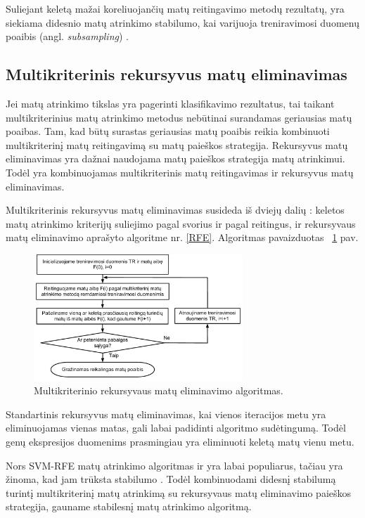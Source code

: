Suliejant keletą mažai koreliuojančių matų reitingavimo metodų rezultatų, yra siekiama didesnio matų atrinkimo stabilumo, kai varijuoja treniravimosi duomenų poaibis (angl. \textit{subsampling}) \cite{yang2011robust}.

\subsection{Multikriterinis rekursyvus matų eliminavimas}

Jei matų atrinkimo tikslas yra pagerinti klasifikavimo rezultatus, tai taikant multikriterinius matų atrinkimo metodus nebūtinai surandamas geriausias matų poaibas. Tam, kad būtų surastas geriausias matų poaibis reikia kombinuoti multikriterinį matų reitingavimą su matų paieškos strategija. Rekursyvus matų eliminavimas yra dažnai naudojama matų paieškos strategija matų atrinkimui. Todėl yra kombinuojamas multikriterinis matų reitingavimas ir rekursyvus matų eliminavimas.

Multikriterinis rekursyvus matų eliminavimas susideda iš dviejų dalių \cite{yang2011robust}: keletos matų atrinkimo kriterijų suliejimo pagal svorius ir pagal reitingus, ir rekursyvaus matų eliminavimo aprašyto algoritme nr. \ref{RFE}. Algoritmas pavaizduotas ~\ref{fig:figure6} pav.
\begin{figure}
 \centering
 \includegraphics[width=0.7\textwidth]{images/mcf-rfe_procedure.pdf}
 \caption{Multikriterinio rekursyvaus matų eliminavimo algoritmas.}
 \label{fig:figure6}
\end{figure}

Standartinis rekursyvus matų eliminavimas, kai vienos iteracijos metu yra eliminuojamas vienas matas, gali labai padidinti algoritmo sudėtingumą. Todėl genų ekspresijos duomenims prasmingiau yra eliminuoti keletą matų vienu metu.

Nors SVM-RFE matų atrinkimo algoritmas ir yra labai populiarus, tačiau yra žinoma, kad jam trūksta stabilumo \cite{guyon2002gene}. Todėl kombinuodami didesnį stabilumą turintį multikriterinį matų atrinkimą su rekursyvaus matų eliminavimo paieškos strategija, gauname stabilesnį matų atrinkimo algoritmą.


